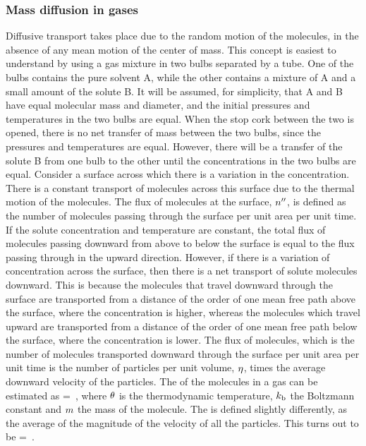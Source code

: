 \subsubsection{Mass diffusion in gases}
Diffusive transport takes place due to the random motion of the molecules, in the absence of any mean motion of the center of mass. This concept is easiest to understand by using a gas mixture in two bulbs separated by a tube. One of the bulbs contains the pure solvent \ce A, while the other contains a mixture of \ce A and a small amount of the solute \ce B. It will be assumed, for simplicity, that \ce A and \ce B have equal molecular mass and diameter, and the initial pressures and temperatures in the two bulbs are equal. When the stop cork between the two is opened, there is no net transfer of mass between the two bulbs, since the pressures and temperatures are equal. However, there will be a transfer of the solute \ce B from one bulb to the other until the concentrations in the two bulbs are equal. Consider a surface across which there is a variation in the concentration. There is a constant transport of molecules across this surface due to the thermal motion of the molecules. The flux of molecules at the surface, ${n}^{\prime\prime}$, is defined as the number of molecules passing through the surface per unit area per unit time. If the solute concentration and temperature are constant, the total flux of molecules passing downward from above to below the surface is equal to the flux passing through in the upward direction. However, if there is a variation of concentration across the surface, then there is a net transport of solute molecules downward. This is because the molecules that travel downward through the surface are transported from a distance of the order of one mean free path above the surface, where the concentration is higher, whereas the molecules which travel upward are transported from a distance of the order of one mean free path below the surface, where the concentration is lower. The flux of molecules, which is the number of molecules transported downward through the surface per unit area per unit time is the number of particles per unit volume, $\eta$, times the average downward velocity of the particles. The  of the molecules in a gas can be estimated as
\beq
\vel{} = \sqrt{\dfrac{3\kboltz\temp}{\mass}}\,,
\eeq
where $\theta$ is the thermodynamic temperature, $k_\text{b}$ the Boltzmann constant and $m$ the mass of the molecule. The  is defined slightly differently, as the average of the magnitude of the velocity of all the particles. This turns out to be
\beq
\vel{} = \sqrt{\dfrac{8\kboltz\temp}{\pi\mass}}\,.
\eeq

